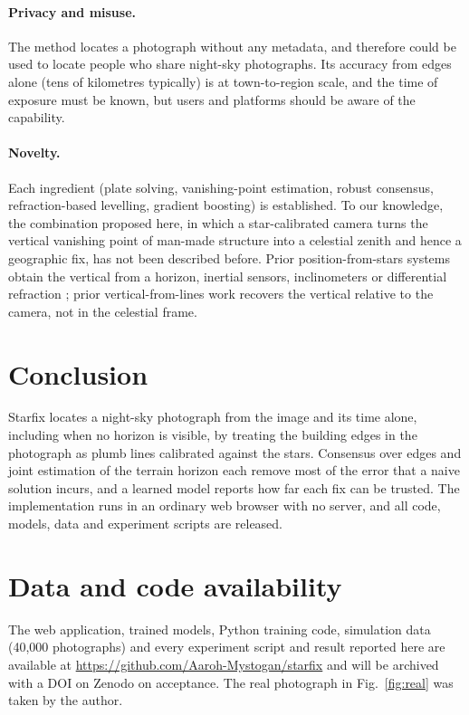 \documentclass[11pt,a4paper]{article}
\begin{document}
\paragraph{Privacy and misuse.} The method locates a photograph without any metadata, and therefore could be used to locate people who share night-sky photographs. Its accuracy from edges alone (tens of kilometres typically) is at town-to-region scale, and the time of exposure must be known, but users and platforms should be aware of the capability.

\paragraph{Novelty.} Each ingredient (plate solving, vanishing-point estimation, robust consensus, refraction-based levelling, gradient boosting) is established. To our knowledge, the combination proposed here, in which a star-calibrated camera turns the vertical vanishing point of man-made structure into a celestial zenith and hence a geographic fix, has not been described before. Prior position-from-stars systems obtain the vertical from a horizon, inertial sensors, inclinometers or differential refraction \citep{rosenwinkel2014patent}; prior vertical-from-lines work recovers the vertical relative to the camera, not in the celestial frame.

\section{Conclusion}

Starfix locates a night-sky photograph from the image and its time alone, including when no horizon is visible, by treating the building edges in the photograph as plumb lines calibrated against the stars. Consensus over edges and joint estimation of the terrain horizon each remove most of the error that a naive solution incurs, and a learned model reports how far each fix can be trusted. The implementation runs in an ordinary web browser with no server, and all code, models, data and experiment scripts are released.

\section*{Data and code availability}
The web application, trained models, Python training code, simulation data (40{,}000 photographs) and every experiment script and result reported here are available at \url{https://github.com/Aaroh-Mystogan/starfix} and will be archived with a DOI on Zenodo on acceptance. The real photograph in Fig.~\ref{fig:real} was taken by the author.
\end{document}
